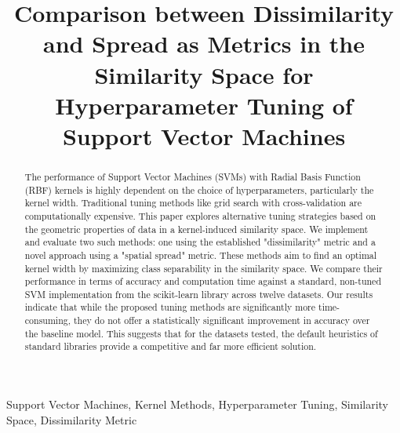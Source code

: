 \documentclass[conference]{IEEEtran}
\begin{document}
\title{Comparison between Dissimilarity and Spread as Metrics in the Similarity Space for Hyperparameter Tuning of Support Vector Machines}

\author{
\and
{}
}

\maketitle

\begin{abstract}
The performance of Support Vector Machines (SVMs) with Radial Basis Function (RBF) kernels is highly dependent on the choice of hyperparameters, particularly the kernel width. Traditional tuning methods like grid search with cross-validation are computationally expensive. This paper explores alternative tuning strategies based on the geometric properties of data in a kernel-induced similarity space. We implement and evaluate two such methods: one using the established "dissimilarity" metric and a novel approach using a "spatial spread" metric. These methods aim to find an optimal kernel width by maximizing class separability in the similarity space. We compare their performance in terms of accuracy and computation time against a standard, non-tuned SVM implementation from the scikit-learn library across twelve datasets. Our results indicate that while the proposed tuning methods are significantly more time-consuming, they do not offer a statistically significant improvement in accuracy over the baseline model. This suggests that for the datasets tested, the default heuristics of standard libraries provide a competitive and far more efficient solution.
\end{abstract}

\begin{IEEEkeywords}
Support Vector Machines, Kernel Methods, Hyperparameter Tuning, Similarity Space, Dissimilarity Metric
\end{IEEEkeywords}
\end{document}
